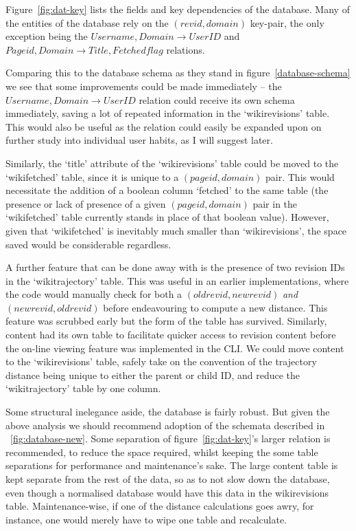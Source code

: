 Figure~\ref{fig:dat-key} lists the fields and key dependencies of the
database. Many of the entities of the database rely on the $(revid,
domain)$ key-pair, the only exception being the $Username, Domain
\rightarrow UserID$ and $Pageid, Domain \rightarrow Title, Fetched
flag$ relations.

Comparing this to the database schema as they stand in
figure~\ref{database-schema} we see that some improvements could be
made immediately -- the $Username, Domain \rightarrow UserID$ relation
could receive its own schema immediately, saving a lot of repeated
information in the `wikirevisions' table. This would also be useful as
the relation could easily be expanded upon on further study into
individual user habits, as I will suggest later.

Similarly, the `title' attribute of the `wikirevisions' table could be
moved to the `wikifetched' table, since it is unique to a
$(pageid,domain)$ pair. This would necessitate the addition of a
boolean column `fetched' to the same table (the presence or lack of
presence of a given $(pageid,domain)$ pair in the `wikifetched' table
currently stands in place of that boolean value). However, given that
`wikifetched' is inevitably much smaller than `wikirevisions', the
space saved would be considerable regardless.

A further feature that can be done away with is the presence of two
revision IDs in the `wikitrajectory' table. This was useful in an
earlier implementations, where the code would manually check for both
a $(oldrevid,newrevid)$ \textit{and} $(newrevid,oldrevid)$ before
endeavouring to compute a new distance. This feature was scrubbed
early but the form of the table has survived. Similarly, content had
its own table to facilitate quicker access to revision content before
the on-line viewing feature was implemented in the CLI. We could move
content to the `wikirevisions' table, safely take on the convention of
the trajectory distance being unique to either the parent or child ID,
and reduce the `wikitrajectory' table by one column.

Some structural inelegance aside, the database is fairly robust. But
given the above analysis we should recommend adoption of the schemata
described in ~\ref{fig:database-new}. Some separation of
figure~\ref{fig:dat-key}'s larger relation is recommended, to reduce
the space required, whilst keeping the some table separations for
performance and maintenance's sake. The large content table is kept
separate from the rest of the data, so as to not slow down the
database, even though a normalised database would have this data in
the wikirevisions table. Maintenance-wise, if one of the distance
calculations goes awry, for instance, one would merely have to wipe
one table and recalculate.


